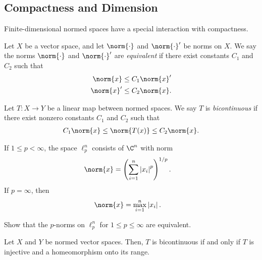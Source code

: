 \documentclass[10pt]{mypackage}
\begin{document}
\subsection{Compactness and Dimension}%
Finite-dimensional normed spaces have a special interaction with compactness.
\begin{definition}
  Let $X$ be a vector space, and let $\norm{\cdot}$ and $\norm{\cdot}'$ be norms on $X$. We say the norms $\norm{\cdot}$ and $\norm{\cdot}'$ are \textit{equivalent} if there exist constants $C_1$ and $C_2$ such that
  \begin{align*}
    \norm{x}&\leq C_1\norm{x}'\\
    \norm{x}' &\leq C_2\norm{x}.
  \end{align*}
\end{definition}
\begin{definition}
  Let $T\colon X\rightarrow Y$ be a linear map between normed spaces. We say $T$ is \textit{bicontinuous} if there exist nonzero constants $C_1$ and $C_2$ such that
  \begin{align*}
    C_1\norm{x}\leq \norm{T(x)}\leq C_2\norm{x}.
  \end{align*}
\end{definition}
\begin{definition}
  If $1 \leq p < \infty$, the space $\ell_{p}^{n}$ consists of $\C^n$ with norm
  \begin{align*}
    \norm{x} &= \left( \sum_{i=1}^{n}\left\vert x_i \right\vert^{p} \right)^{1/p}.
  \end{align*}
  If $ p = \infty $, then
  \begin{align*}
    \norm{x} &= \max_{i=1}^{n}\left\vert x_i \right\vert.
  \end{align*}
\end{definition}
\begin{exercise}
  Show that the $p$-norms on $\ell_{p}^{n}$ for $1 \leq p \leq \infty$ are equivalent.
\end{exercise}
\begin{proposition}
  Let $X$ and $Y$ be normed vector spaces. Then, $T$ is bicontinuous if and only if $T$ is injective and a homeomorphism onto its range.
\end{proposition}
\end{document}
